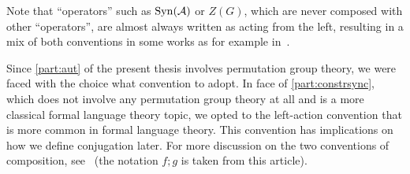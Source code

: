 Note that ``operators'' such as $\operatorname{Syn}(\mathcal A)$ or $Z(G)$, which are never composed with other ``operators'', 
are almost always written as acting from the left, resulting in a mix of both conventions
in some works as for example in~\cite{DBLP:journals/tcs/AraujoBC13,Kurzweil04}.

Since \cref{part:aut} of the present thesis involves permutation group theory, we
were faced with the choice what convention to adopt. In face of \cref{part:constrsync}, which
does not involve any permutation group theory at all and is a more classical formal language theory topic,
we opted to the left-action convention that is more common in formal language theory.		
This convention has implications on how we define conjugation later. For more discussion on the two conventions of composition, 
see~\cite{nlab:composition} (the notation $f ; g$ is taken from this article).
